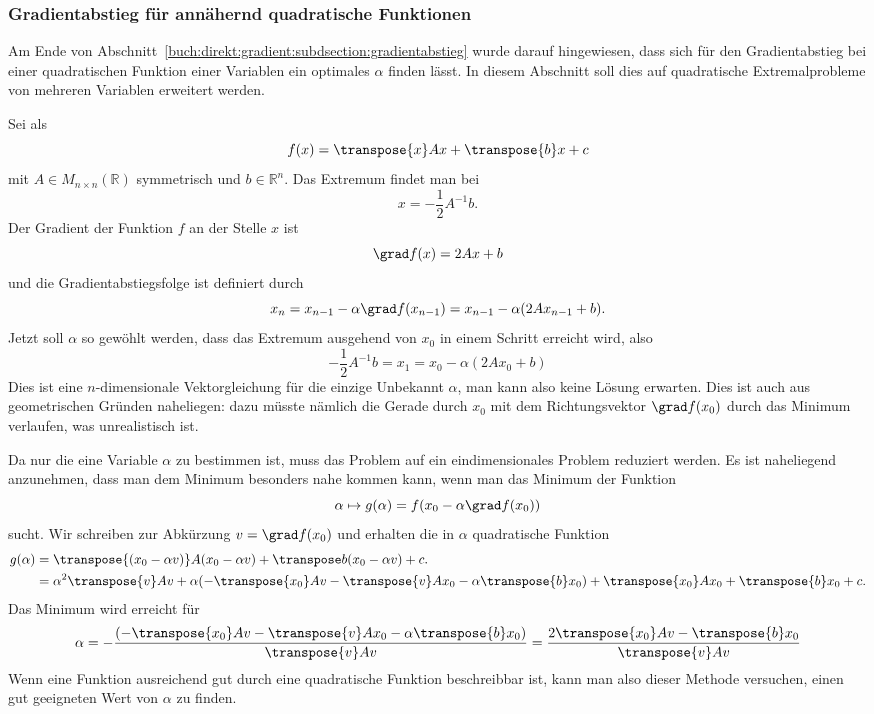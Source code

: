 %
%
\subsubsection{Gradientabstieg für annähernd quadratische Funktionen}
Am Ende von Abschnitt~\ref{buch:direkt:gradient:subdsection:gradientabstieg}
wurde darauf hingewiesen, dass sich für den Gradientabstieg bei einer
quadratischen Funktion einer Variablen ein optimales $\alpha$ finden lässt.
In diesem Abschnitt soll dies auf quadratische Extremalprobleme von
mehreren Variablen erweitert werden.

Sei als 
\[
f(x)
=
\transpose{x}Ax+\transpose{b}x+c
\]
mit $A\in M_{n\times n}(\mathbb{R})$ symmetrisch und $b\in\mathbb{R}^n$.
Das Extremum findet man bei 
\[
x = -\frac12 A^{-1} b.
\]
Der Gradient der Funktion $f$ an der Stelle $x$ ist
\[
\grad f(x)
=
2Ax + b
\]
und die Gradientabstiegsfolge ist definiert durch
\[
x_n
=
x_{n-1} -\alpha \grad f(x_{n-1})
=
x_{n-1} - \alpha (2A x_{n-1} + b).
\]
Jetzt soll $\alpha$ so gewöhlt werden, dass das Extremum ausgehend von 
$x_0$ in einem Schritt erreicht wird, also
\[
-\frac12 A^{-1}b
=
x_1
=
x_0 - \alpha (2A x_0 + b)
\]
Dies ist eine $n$-dimensionale Vektorgleichung für die einzige Unbekannt
$\alpha$, man kann also keine Lösung erwarten.
Dies ist auch aus geometrischen Gründen naheliegen: dazu müsste nämlich
die Gerade durch $x_0$ mit dem Richtungsvektor $\grad f(x_0)$ durch das
Minimum verlaufen, was unrealistisch ist.

Da nur die eine Variable $\alpha$ zu bestimmen ist, muss das Problem auf
ein eindimensionales Problem reduziert werden.
Es ist naheliegend anzunehmen, dass man dem Minimum besonders nahe
kommen kann, wenn man das Minimum der Funktion
\[
\alpha
\mapsto
g(\alpha)
=
f(x_0 - \alpha\grad f(x_0))
\]
sucht.
Wir schreiben zur Abkürzung $v=\grad f(x_0)$ und erhalten
die in $\alpha$ quadratische Funktion
\begin{align*}
g(\alpha)
&=
\transpose{(x_0 - \alpha v)}A(x_0-\alpha v) + \transpose b(x_0-\alpha v) + c.
\\
&=
\alpha^2
\transpose{v}Av
+
\alpha
(-\transpose{x_0}Av -\transpose{v}Ax_0 -\alpha \transpose{b}x_0)
+
\transpose{x_0}Ax_0+\transpose{b}x_0 + c.
\end{align*}
Das Minimum wird erreicht für
\[
\alpha
=
-\frac{
(-\transpose{x_0}Av -\transpose{v}Ax_0 -\alpha \transpose{b}x_0)
}{
\transpose{v}Av
}
=
\frac{2\transpose{x_0}Av -\transpose{b}x_0}{\transpose{v}Av}
\]
Wenn eine Funktion ausreichend gut durch eine quadratische Funktion
beschreibbar ist, kann man also dieser Methode versuchen, einen gut
geeigneten Wert von $\alpha$ zu finden.



